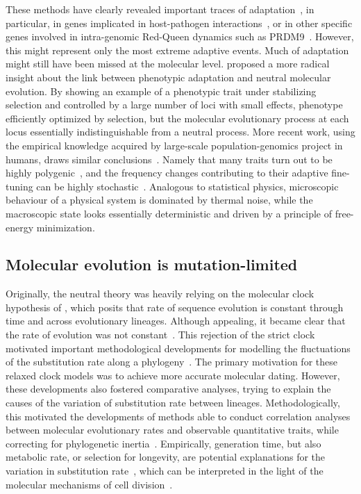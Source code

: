 These methods have clearly revealed important traces of adaptation~\citep{Bustamante2005, Halligan2010, Enard2014}, in particular, in genes implicated in host-pathogen interactions~\citep{Enard2016, Grandaubert2019}, or in other specific genes involved in intra-genomic Red-Queen dynamics such as PRDM9~\citep{Thomas2009,Oliver2009,Ponting2011,Latrille2017}.
However, this might represent only the most extreme adaptive events.
Much of adaptation might still have been missed at the molecular level.
\citet{kimura1983neutral} proposed a more radical insight about the link between phenotypic adaptation and neutral molecular evolution.
By showing an example of a phenotypic trait under stabilizing selection and controlled by a large number of loci with small effects, phenotype efficiently optimized by selection, but the molecular evolutionary process at each locus essentially indistinguishable from a neutral process.
More recent work, using the empirical knowledge acquired by large-scale population-genomics project in humans, draws similar conclusions~\citep{Simons2018}.
Namely that many traits turn out to be highly polygenic~\citep{Pritchard2002}, and the frequency changes contributing to their adaptive fine-tuning can be highly stochastic~\citep{Sella2019}.
Analogous to statistical physics, microscopic behaviour of a physical system is dominated by thermal noise, while the macroscopic state looks essentially deterministic and driven by a principle of free-energy minimization.

\subsection{Molecular evolution is mutation-limited}
\label{subsec:molecular-evolution-is-mutation-limited}

Originally, the neutral theory was heavily relying on the molecular clock hypothesis of \citet{Zuckerkandl1965}, which posits that rate of sequence evolution is constant through time and across evolutionary lineages.
Although appealing, it became clear that the rate of evolution was not constant~\citep{ChungWu1985, Li1987, Bulmer1991, Gaut1992}.
This rejection of the strict clock motivated important methodological developments for modelling the fluctuations of the substitution rate along a phylogeny~\citep{Sanderson1997, Thorne1998, Kishino2001, Aris-Brosou2002, Drummond2006, Lepage2007}.
The primary motivation for these relaxed clock models was to achieve more accurate molecular dating.
However, these developments also fostered comparative analyses, trying to explain the causes of the variation of substitution rate between lineages.
Methodologically, this motivated the developments of methods able to conduct correlation analyses between molecular evolutionary rates and observable quantitative traits, while correcting for phylogenetic inertia~\citep{Lanfear2010a, Lartillot2011}.
Empirically, generation time, but also metabolic rate, or selection for longevity, are potential explanations for the variation in substitution rate~\citep{Lartillot2012}, which can be interpreted in the light of the molecular mechanisms of cell division~\citep{Gao2016}.


